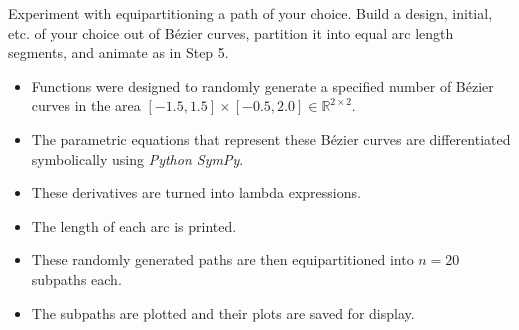 \documentclass[11pt]{article}
\providecommand{\tightlist}{%
      \setlength{\itemsep}{0pt}\setlength{\parskip}{0pt}}
\begin{document}
Experiment with equipartitioning a path of your choice. Build a design,
initial, etc. of your choice out of Bézier curves, partition it into
equal arc length segments, and animate as in Step 5.

\begin{itemize}
\tightlist
\item
  Functions were designed to randomly generate a specified number of
  Bézier curves in the area
  \([-1.5,1.5] \times [-0.5,2.0] \in \mathbb{R}^{2\times2}\).
\item
  The parametric equations that represent these Bézier curves are
  differentiated symbolically using \emph{Python SymPy}.
\item
  These derivatives are turned into lambda expressions.
\item
  The length of each arc is printed.
\item
  These randomly generated paths are then equipartitioned into \(n=20\)
  subpaths each.
\item
  The subpaths are plotted and their plots are saved for display.
\end{itemize}
\end{document}

